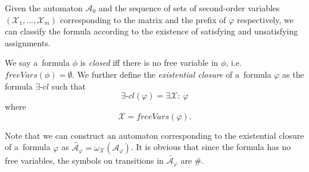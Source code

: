 % 

Given the automaton $\mathcal{A}_0$ and the sequence of sets of second-order
variables $(\mathcal{X}_1,\ldots,\mathcal{X}_m)$ corresponding to the matrix
and the prefix of $\varphi$ respectively, we can classify the formula according
to the existence of satisfying and unsatisfying assignments.

\begin{defz}
We say a~formula $\phi$ is \emph{closed} iff there is no free variable in
$\phi$, i.e.
$\mathit{freeVars}(\phi) = \emptyset$.
We further define the \emph{existential closure} of a~formula $\varphi$ as
the formula $\exists\mbox{-}\mathit{cl}$ such that
\begin{equation}
 \exists\mbox{-}\mathit{cl}(\varphi) = \exists\mathcal{X}:\ \varphi
\end{equation}
where
\begin{equation}
 \mathcal{X} = \mathit{freeVars}(\varphi).
\end{equation}

Note that we can construct an automaton corresponding to the existential closure
of a~formula $\varphi$ as $\widetilde{\mathcal{A_\varphi}} =
\omega_\mathcal{X}(\mathcal{A}_\varphi)$.
It is obvious that since the formula has no free variables, the symbols on
transitions in $\widetilde{\mathcal{A}_\varphi}$ are $\#$.
\end{defz}

